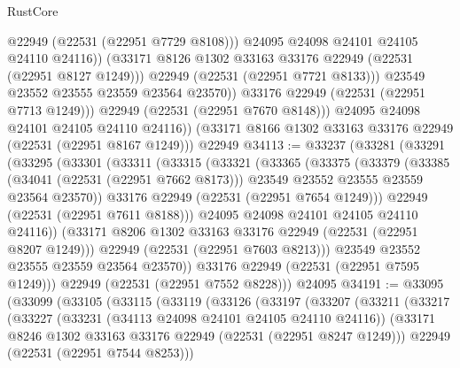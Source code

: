 \begin{lexlean}{RustCore}
\begin{coremodule}
                        @22949
                        (@22531 (@22951 @7729 @8108)))
                      @24095
                      @24098
                      @24101
                      @24105
                      @24110
                      @24116))
                  (@33171 @8126 @1302 @33163 @33176 @22949 (@22531 (@22951 @8127 @1249)))
                  @22949
                  (@22531 (@22951 @7721 @8133)))
                @23549
                @23552
                @23555
                @23559
                @23564
                @23570))
            @33176
            @22949
            (@22531 (@22951 @7713 @1249)))
          @22949
          (@22531 (@22951 @7670 @8148)))
        @24095
        @24098
        @24101
        @24105
        @24110
        @24116))
    (@33171 @8166 @1302 @33163 @33176 @22949 (@22531 (@22951 @8167 @1249)))
    @22949
@34113 := @33237
    (@33281
      (@33291
        (@33295
          (@33301
            (@33311
              (@33315
                (@33321
                  (@33365
                    (@33375
                      (@33379
                        (@33385
                          (@34041 (@22531 (@22951 @7662 @8173)))
                          @23549
                          @23552
                          @23555
                          @23559
                          @23564
                          @23570))
                      @33176
                      @22949
                      (@22531 (@22951 @7654 @1249)))
                    @22949
                    (@22531 (@22951 @7611 @8188)))
                  @24095
                  @24098
                  @24101
                  @24105
                  @24110
                  @24116))
              (@33171 @8206 @1302 @33163 @33176 @22949 (@22531 (@22951 @8207 @1249)))
              @22949
              (@22531 (@22951 @7603 @8213)))
            @23549
            @23552
            @23555
            @23559
            @23564
            @23570))
        @33176
        @22949
        (@22531 (@22951 @7595 @1249)))
      @22949
      (@22531 (@22951 @7552 @8228)))
    @24095
@34191 := @33095
    (@33099
      (@33105
        (@33115
          (@33119
            (@33126
              (@33197
                (@33207
                  (@33211
                    (@33217
                      (@33227
                        (@33231 (@34113 @24098 @24101 @24105 @24110 @24116))
                        (@33171 @8246 @1302 @33163 @33176 @22949 (@22531 (@22951 @8247 @1249)))
                        @22949
                        (@22531 (@22951 @7544 @8253)))

\end{coremodule}
\end{lexlean}
